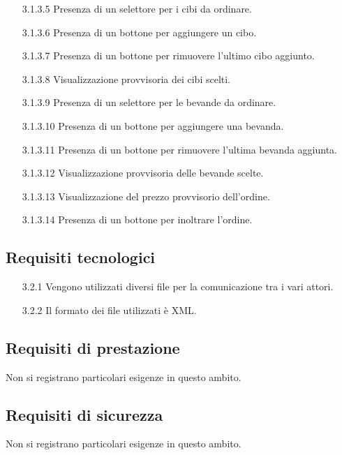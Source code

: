 \documentclass[a4paper,11pt]{article}       %
\begin{document}
\begin{itemize}
\begin{itemize}
                \item[3.1.3.5] Presenza di un selettore per i cibi da ordinare.
                \item[3.1.3.6] Presenza di un bottone per aggiungere un cibo.
                \item[3.1.3.7] Presenza di un bottone per rimuovere l'ultimo cibo aggiunto.
                \item[3.1.3.8] Visualizzazione provvisoria dei cibi scelti.
                \item[3.1.3.9] Presenza di un selettore per le bevande da ordinare.
                \item[3.1.3.10] Presenza di un bottone per aggiungere una bevanda.
                \item[3.1.3.11] Presenza di un bottone per rimuovere l'ultima bevanda aggiunta.
                \item[3.1.3.12] Visualizzazione provvisoria delle bevande scelte.
                \item[3.1.3.13] Visualizzazione del prezzo provvisorio dell'ordine.
                \item[3.1.3.14] Presenza di un bottone per inoltrare l'ordine.
            \end{itemize}
    \end{itemize}
    
    \subsection{Requisiti tecnologici}
        \begin{itemize}
            \item[3.2.1] Vengono utilizzati diversi file per la comunicazione tra i vari attori.
            \item[3.2.2] Il formato dei file utilizzati è \gls{XML}.
        \end{itemize}
    
    \subsection{Requisiti di prestazione}
    Non si registrano particolari esigenze in questo ambito.
    
    \subsection{Requisiti di sicurezza}
    Non si registrano particolari esigenze in questo ambito.
    
\end{document}
